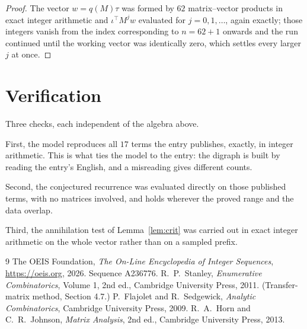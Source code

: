 \documentclass[11pt,a4paper]{article}
\theoremstyle{plain}
\theoremstyle{definition}
\begin{document}
\begin{proof}
The vector $w=q(M)\tau$ was formed by $62$ matrix--vector products in exact integer
arithmetic and $\iota^{\!\top}M^{j}w$ evaluated for $j=0,1,\dots$, again exactly; those
integers vanish from the index corresponding to $n=62+1$ onwards and the run continued
until the working vector was identically zero, which settles every larger $j$ at once.
\end{proof}

\section{Verification}

Three checks, each independent of the algebra above.

First, the model reproduces all $17$ terms the entry publishes, exactly, in integer
arithmetic. This is what ties the model to the entry: the digraph is built by reading the
entry's English, and a misreading gives different counts.

Second, the conjectured recurrence was evaluated directly on those published terms, with no
matrices involved, and holds wherever the proved range and the data overlap.

Third, the annihilation test of Lemma~\ref{lem:crit} was carried out in exact integer
arithmetic on the whole vector rather than on a sampled prefix.

\begin{thebibliography}{9}
 The OEIS Foundation, \emph{The On-Line Encyclopedia of Integer
Sequences}, \url{https://oeis.org}, 2026. Sequence A236776.
 R.~P.~Stanley, \emph{Enumerative Combinatorics}, Volume 1, 2nd ed.,
Cambridge University Press, 2011. (Transfer-matrix method, Section 4.7.)
 P.~Flajolet and R.~Sedgewick, \emph{Analytic Combinatorics}, Cambridge
University Press, 2009.
 R.~A.~Horn and C.~R.~Johnson, \emph{Matrix Analysis}, 2nd ed., Cambridge
University Press, 2013.
\end{thebibliography}
\end{document}
